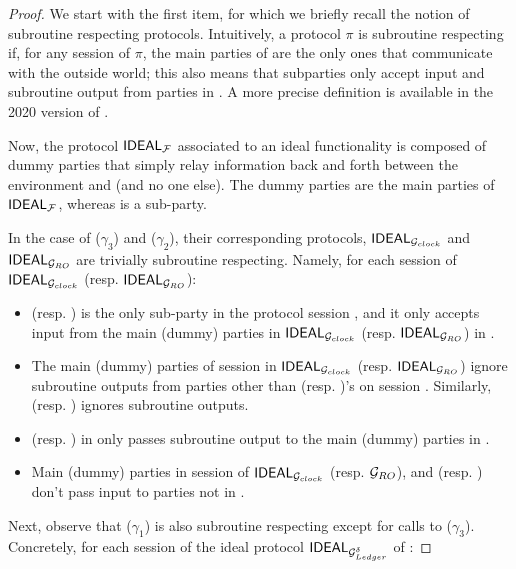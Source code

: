 \begin{proof}
  We start with the first item, for which we briefly recall the notion of
  subroutine respecting protocols. Intuitively, a protocol $\pi$ is subroutine
  respecting if, for any session \sid of $\pi$, the main parties of \sid are the
  only ones that communicate with the outside world; this also means that
  subparties only accept input and subroutine output from parties in \sid. A
  more precise definition is available in the 2020 version of \cite{canetti00}.

  Now, the protocol $\mathsf{IDEAL}_\mathcal{F}$ associated to an ideal functionality
  \IdealF is composed of dummy parties that simply relay information back and
  forth between the environment \Env and \IdealF (and no one else). The dummy
  parties are the main parties of $\mathsf{IDEAL}_\mathcal{F}$, whereas \IdealF is a
  sub-party.

  In the case of \IdealGclock ($\gamma_3$) and \IdealGRO ($\gamma_2$), their
  corresponding protocols, $\mathsf{IDEAL}_{\mathcal{G}_{clock}}$ and $\mathsf{IDEAL}_{\mathcal{G}_{RO}}$
  are trivially subroutine respecting. Namely, for each session \sid of
  $\mathsf{IDEAL}_{\mathcal{G}_{clock}}$ (resp. $\mathsf{IDEAL}_{\mathcal{G}_{RO}}$):

  \begin{itemize}
  \item \IdealGclock (resp. \IdealGRO) is the only sub-party in the protocol
    session \sid, and it only accepts input from the main (dummy) parties in
    $\mathsf{IDEAL}_{\mathcal{G}_{clock}}$ (resp. $\mathsf{IDEAL}_{\mathcal{G}_{RO}}$) in \sid.
  \item The main (dummy) parties of session \sid in $\mathsf{IDEAL}_{\mathcal{G}_{clock}}$
    (resp. $\mathsf{IDEAL}_{\mathcal{G}_{RO}}$) ignore subroutine outputs from parties other
    than \IdealGclock (resp. \IdealGRO)'s on session \sid. Similarly,
    \IdealGclock (resp. \IdealGRO) ignores subroutine outputs.
  \item \IdealGclock (resp. \IdealGRO) in \sid only passes subroutine output to
    the main (dummy) parties in \sid.
  \item Main (dummy) parties in session \sid of $\mathsf{IDEAL}_{\mathcal{G}_{clock}}$ (resp.
    $\mathcal{G}_{RO}$), and \IdealGclock (resp. \IdealGRO)  don't pass input to
    parties not in \sid. 
  \end{itemize}

  Next, observe that \IdealGdledger ($\gamma_1$) is also subroutine respecting
  except for calls to \IdealGclock ($\gamma_3$). Concretely, for each session
  of the ideal protocol $\mathsf{IDEAL}_{\mathcal{G}_{Ledger}^\delta}$ of \IdealGdledger:


\end{proof}
